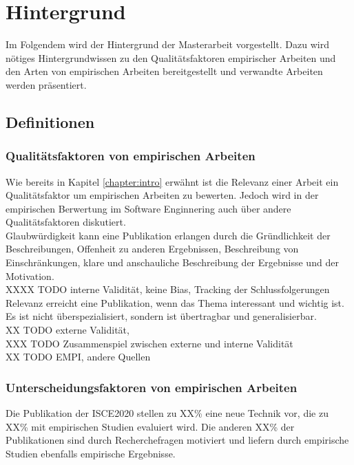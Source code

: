 \chapter{Hintergrund}
\label{chapter:background}
Im Folgendem wird der Hintergrund der Masterarbeit vorgestellt. Dazu wird nötiges Hintergrundwissen zu den Qualitätsfaktoren empirischer Arbeiten und den Arten von empirischen Arbeiten bereitgestellt und verwandte Arbeiten werden präsentiert.\\

\section{Definitionen}

\subsection{Qualitätsfaktoren von empirischen Arbeiten}
Wie bereits in Kapitel \ref{chapter:intro} erwähnt ist die Relevanz einer Arbeit ein Qualitätsfaktor um empirischen Arbeiten zu bewerten. Jedoch wird in der empirischen Berwertung im Software Enginnering auch über andere Qualitätsfaktoren diskutiert. \\

Glaubwürdigkeit kann eine Publikation erlangen durch die Gründlichkeit der Beschreibungen, Offenheit zu anderen Ergebnissen, Beschreibung von Einschränkungen, klare und anschauliche Beschreibung der Ergebnisse und der Motivation. \\
XXXX TODO interne Validität, keine Bias, Tracking der Schlussfolgerungen \\

Relevanz erreicht eine Publikation, wenn das Thema interessant und wichtig ist. Es ist nicht überspezialisiert, sondern ist übertragbar und generalisierbar. \\
XX TODO externe Validität,  \\

XXX TODO Zusammenspiel zwischen externe und interne Validität \\

XX TODO EMPI, andere Quellen \\


\subsection{Unterscheidungsfaktoren von empirischen Arbeiten}
\label{sec:empi}
Die Publikation der ISCE2020 stellen zu XX\% eine neue Technik vor, die zu XX\% mit empirischen Studien evaluiert wird. Die anderen XX\% der Publikationen sind durch Recherchefragen motiviert und liefern durch empirische Studien ebenfalls empirische Ergebnisse. \\

